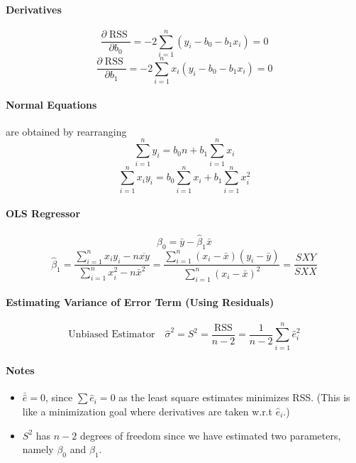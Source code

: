\documentclass[11pt]{article}
\begin{document}
\paragraph{Derivatives}
\begin{equation*}
    \frac{\partial \operatorname{RSS}}{\partial b_{0}}=-2 \sum_{i=1}^{n}\left(y_{i}-b_{0}-b_{1} x_{i}\right)=0
\end{equation*}
\begin{equation*}
    \frac{\partial \operatorname{RSS}}{\partial b_{1}}=-2 \sum_{i=1}^{n} x_{i}\left(y_{i}-b_{0}-b_{1} x_{i}\right)=0
\end{equation*}
\paragraph{Normal Equations} are obtained by rearranging
\begin{equation}
    \sum_{i=1}^{n} y_{i}=b_{0} n+b_{1} \sum_{i=1}^{n} x_{i}
\end{equation}
\begin{equation}
    \sum_{i=1}^{n} x_{i} y_{i}=b_{0} \sum_{i=1}^{n} x_{i}+b_{1} \sum_{i=1}^{n} x_{i}^{2}
\end{equation}
\paragraph{OLS Regressor}
\begin{equation*}
    \hat{\beta}_{0}=\bar{y}-\hat{\beta}_{1} \bar{x}
\end{equation*}
\begin{equation*}
    \hat{\beta}_{1}=\frac{\sum_{i=1}^{n} x_{i} y_{i}-n \overline{x y}}{\sum_{i=1}^{n} x_{i}^{2}-n \bar{x}^{2}}=\frac{\sum_{i=1}^{n}\left(x_{i}-\bar{x}\right)\left(y_{i}-\bar{y}\right)}{\sum_{i=1}^{n}\left(x_{i}-\bar{x}\right)^{2}}=\frac{S X Y}{S X X}
\end{equation*}
\paragraph{Estimating Variance of Error Term (Using Residuals)}
\begin{equation*}
    \text{Unbiased Estimator} \quad \hat{\sigma}^2 = S^{2}=\frac{\mathrm{RSS}}{n-2}=\frac{1}{n-2} \sum_{i=1}^{n} \hat{e}_{i}^{2}
\end{equation*}
\paragraph{Notes}
\begin{itemize}
    \item $\bar{\hat{e}}=0$, since $\sum \hat{e}_i = 0$ as the least square estimates minimizes RSS. (This is like a minimization goal where derivatives are taken w.r.t $\hat{e}_i$.)
    \item $S^2$ has $n-2$ degrees of freedom since we have estimated two parameters, namely $\beta_0$ and $\beta_1$.
\end{itemize}
\end{document}
